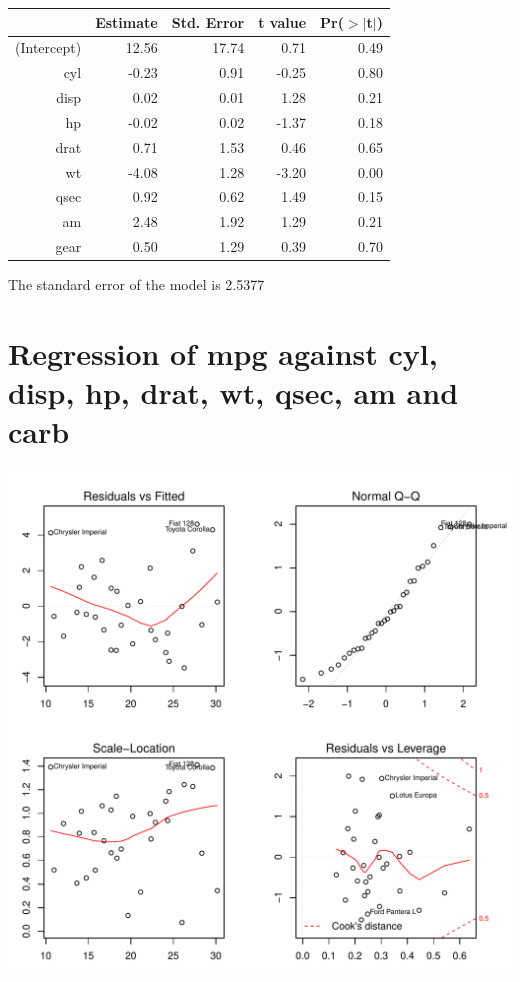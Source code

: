 \documentclass{article}\usepackage[]{graphicx}\usepackage[]{color}
\makeatletter
\def\maxwidth{ %
  \ifdim\Gin@nat@width>\linewidth
    \linewidth
  \else
    \Gin@nat@width
  \fi
}
\newenvironment{knitrout}{}{} %
\makeatother
\begin{document}
\begin{table}[ht]
\centering
\begin{tabular}{rrrrr}
  \hline
 & Estimate & Std. Error & t value & Pr($>$$|$t$|$) \\ 
  \hline
(Intercept) & 12.56 & 17.74 & 0.71 & 0.49 \\ 
  cyl & -0.23 & 0.91 & -0.25 & 0.80 \\ 
  disp & 0.02 & 0.01 & 1.28 & 0.21 \\ 
  hp & -0.02 & 0.02 & -1.37 & 0.18 \\ 
  drat & 0.71 & 1.53 & 0.46 & 0.65 \\ 
  wt & -4.08 & 1.28 & -3.20 & 0.00 \\ 
  qsec & 0.92 & 0.62 & 1.49 & 0.15 \\ 
  am & 2.48 & 1.92 & 1.29 & 0.21 \\ 
  gear & 0.50 & 1.29 & 0.39 & 0.70 \\ 
   \hline
\end{tabular}
\end{table}




The standard error of the model is 2.5377

\newpage

\section{Regression of mpg against cyl, disp, hp, drat, wt, qsec, am and carb }
\begin{knitrout}
\color{fgcolor}

{\centering \includegraphics[width=\maxwidth]{figure/lm-cyl-disp-hp-drat-wt-qsec-am-carb} 

}



\end{knitrout}
\end{document}
